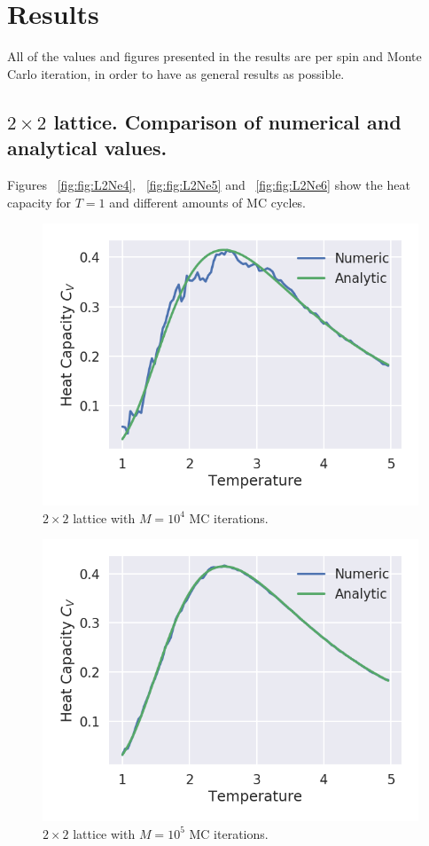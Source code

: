 \documentclass[aps,reprint]{revtex4-1}
\begin{document}
\section{Results} \label{sec:results}
All of the values and figures presented in the results are per spin and Monte Carlo
iteration, in order to have as general results as possible.
\subsection{$2 \times 2$ lattice. Comparison of numerical and analytical values.}
Figures ~\ref{fig:fig:L2Ne4}, ~\ref{fig:fig:L2Ne5} and ~\ref{fig:fig:L2Ne6} show
the heat capacity for $T = 1$ and different amounts of MC cycles.
\begin{figure}
  \centering
  \includegraphics[width=\columnwidth]{figures/L2Ne4.png}
  \caption{$2 \times 2$ lattice with $M = 10^4$ MC iterations.}
  \label{fig:L2Ne4}
\end{figure}
\begin{figure}
  \centering
  \includegraphics[width=\columnwidth]{figures/L2Ne5.png}
  \caption{$2 \times 2$ lattice with $M = 10^5$ MC iterations.}
  \label{fig:L2Ne5}
\end{figure}
\end{document}

